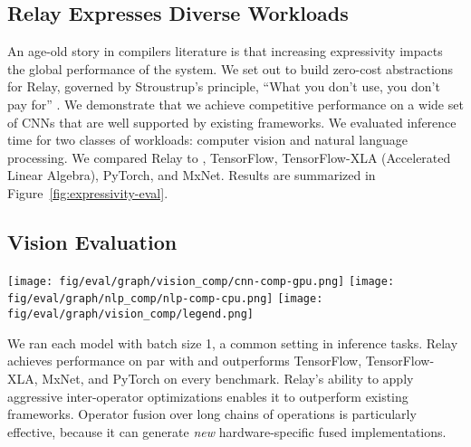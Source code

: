 \subsection{Relay Expresses Diverse Workloads}
\label{sec:perf-gpu}

An age-old story in compilers literature is that increasing expressivity
  impacts the global performance of the system.
We set out to build zero-cost abstractions for Relay,
  governed by Stroustrup's principle, ``What you don't use, you don't pay
  for'' \citep{bjarne}.
We demonstrate that we achieve competitive performance on a wide set of CNNs that are well supported by existing frameworks.
We evaluated inference time for two classes of workloads: computer vision and natural language processing.
We compared Relay to \nnvm,
  TensorFlow, TensorFlow-XLA (Accelerated Linear Algebra), PyTorch, and MxNet.
Results are summarized in Figure~\ref{fig:expressivity-eval}.

\subsection{Vision Evaluation}

\begin{figure*}[htbp!]
  \centering
  \texttt{[image: fig/eval/graph/vision\_comp/cnn-comp-gpu.png]}
  \texttt{[image: fig/eval/graph/nlp\_comp/nlp-comp-cpu.png]}
  \texttt{[image: fig/eval/graph/vision\_comp/legend.png]}
  \caption{\textmd{
    Inference speedup of Relay relative to popular frameworks
      on vision and NLP benchmarks.
    The vision benchmarks used an NVIDIA Titan-V GPU, and the NLP benchmarks ran on CPU only.
    We ran 1000 trials for each model, except for CharRNN, on which we used 100 trials.
    Relay matches the performance of NNVM on vision but additionally supports NLP,
      where Relay provides performance competitive to the state of the art (up to
        2.3$\times$ speedup over MxNet on GRU).
  }}
  \label{fig:expressivity-eval}
\end{figure*}

We ran each model with
  batch size 1, a common setting in inference tasks.
Relay achieves performance on par with \nnvm
  and outperforms TensorFlow, TensorFlow-XLA, MxNet, and
  PyTorch on every benchmark.
Relay's ability to apply aggressive inter-operator optimizations
  enables it to outperform existing frameworks.
Operator fusion over long chains of operations is particularly effective,
  because it can generate \textit{new} hardware-specific fused implementations.

